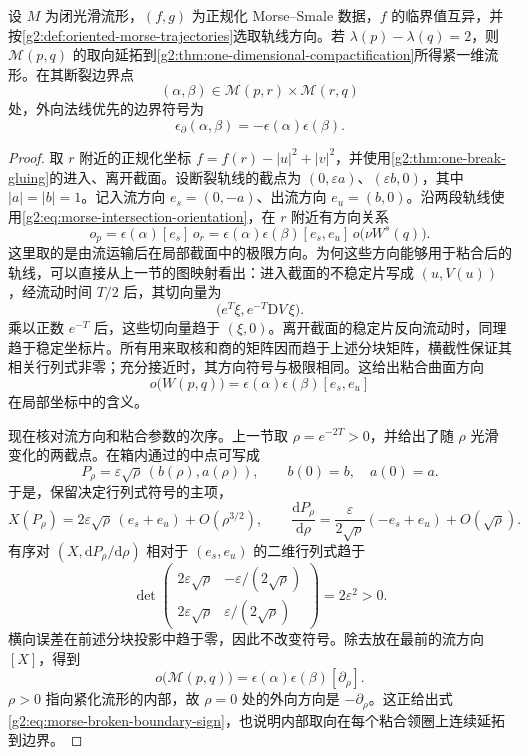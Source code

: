 \begin{proposition}\label{g2:prop:morse-broken-boundary-sign}
	设 \(M\) 为闭光滑流形，\((f,g)\) 为正规化 Morse--Smale 数据，\(f\) 的临界值互异，并按\cref{g2:def:oriented-morse-trajectories}选取轨线方向。若 \(\lambda(p)-\lambda(q)=2\)，则 \(\mathcal M(p,q)\) 的取向延拓到\cref{g2:thm:one-dimensional-compactification}所得紧一维流形。在其断裂边界点
	\[
		(\alpha,\beta)\in\mathcal M(p,r)\times\mathcal M(r,q)
	\]
	处，外向法线优先的边界符号为
	\begin{equation}\label{g2:eq:morse-broken-boundary-sign}
		\epsilon_\partial(\alpha,\beta)
		=-\epsilon(\alpha)\epsilon(\beta).
	\end{equation}
\end{proposition}
\begin{proof}
	取 \(r\) 附近的正规化坐标 \(f=f(r)-|u|^2+|v|^2\)，并使用\cref{g2:thm:one-break-gluing}的进入、离开截面。设断裂轨线的截点为 \((0,\varepsilon a)\)、\((\varepsilon b,0)\)，其中 \(|a|=|b|=1\)。记入流方向 \(e_s=(0,-a)\)、出流方向 \(e_u=(b,0)\)。沿两段轨线使用\eqref{g2:eq:morse-intersection-orientation}，在 \(r\) 附近有方向关系
	\[
		o_p
		=\epsilon(\alpha)[e_s]\,o_r
		=\epsilon(\alpha)\epsilon(\beta)[e_s,e_u]\,
		o\bigl(\nu W^s(q)\bigr).
	\]
	这里取的是由流运输后在局部截面中的极限方向。为何这些方向能够用于粘合后的轨线，可以直接从上一节的图映射看出：进入截面的不稳定片写成 \((u,V(u))\)，经流动时间 \(T/2\) 后，其切向量为
	\[
		\bigl(e^T\xi,e^{-T}\mathrm{D}V\,\xi\bigr).
	\]
	乘以正数 \(e^{-T}\) 后，这些切向量趋于 \((\xi,0)\)。离开截面的稳定片反向流动时，同理趋于稳定坐标片。所有用来取核和商的矩阵因而趋于上述分块矩阵，横截性保证其相关行列式非零；充分接近时，其方向符号与极限相同。这给出粘合曲面方向
	\[
		o\bigl(W(p,q)\bigr)
		=\epsilon(\alpha)\epsilon(\beta)[e_s,e_u]
	\]
	在局部坐标中的含义。

	现在核对流方向和粘合参数的次序。上一节取 \(\rho=e^{-2T}>0\)，并给出了随 \(\rho\) 光滑变化的两截点。在箱内通过的中点可写成
	\[
		P_\rho=\varepsilon\sqrt\rho\,(b(\rho),a(\rho)),
		\qquad b(0)=b,\quad a(0)=a.
	\]
	于是，保留决定行列式符号的主项，
	\[
		X(P_\rho)=2\varepsilon\sqrt\rho\,(e_s+e_u)+O(\rho^{3/2}),
		\qquad
		\frac{\mathrm{d}P_\rho}{\mathrm{d}\rho}
		=\frac{\varepsilon}{2\sqrt\rho}(-e_s+e_u)+O(\sqrt\rho).
	\]
	有序对 \((X,\mathrm{d}P_\rho/\mathrm{d}\rho)\) 相对于 \((e_s,e_u)\) 的二维行列式趋于
	\[
		\det
		\begin{pmatrix}
			2\varepsilon\sqrt\rho&-\varepsilon/(2\sqrt\rho)\\
			2\varepsilon\sqrt\rho&\varepsilon/(2\sqrt\rho)
		\end{pmatrix}
		=2\varepsilon^2>0.
	\]
	横向误差在前述分块投影中趋于零，因此不改变符号。除去放在最前的流方向 \([X]\)，得到
	\[
		o\bigl(\mathcal M(p,q)\bigr)
		=\epsilon(\alpha)\epsilon(\beta)[\partial_\rho].
	\]
	\(\rho>0\) 指向紧化流形的内部，故 \(\rho=0\) 处的外向方向是 \(-\partial_\rho\)。这正给出式\eqref{g2:eq:morse-broken-boundary-sign}，也说明内部取向在每个粘合领圈上连续延拓到边界。
\end{proof}

